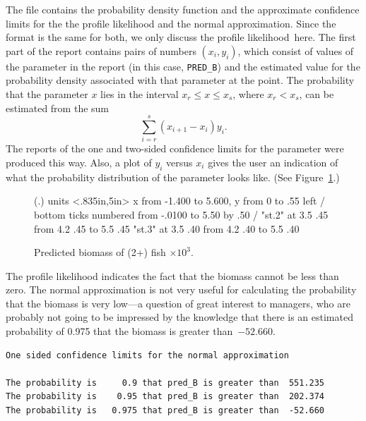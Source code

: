 \documentclass{admbmanual}
\newcommand\apl{profile likelihood}
\begin{document}
The file contains the probability density function and the approximate
confidence limits for the the profile likelihood and the normal approximation.
Since the format is the same for both, we only discuss the \apl\ here. The first
part of the report contains pairs of numbers $(x_i,y_i)$, which consist of
values of the parameter in the report (in this case, \texttt{PRED\_B}) and the
estimated value for the probability density associated with that parameter at
the point. The probability that the parameter $x$ lies in the interval
$x_r \le x\le x_s$,
where $x_r<x_s$, can be estimated from the sum
$$\sum_{i=r}^s (x_{i+1}-x_i)y_i.$$
The reports of the one and two-sided confidence limits for the parameter were
produced this way. Also, a plot of $y_i$ versus $x_i$ gives the user an
indication of what the probability distribution of the parameter looks like.
(See Figure~\ref{fig:05}.)
\begin{figure}[htbp]
\centering\hskip1pt\beginpicture
    \setplotsymbol ({\eightrm .})
  \setcoordinatesystem units <.835in,5in>
  \setplotarea x from -1.400 to 5.600, y from 0 to .55
  \axis left
  /
  \axis bottom
   ticks
    numbered from -.0100 to 5.50 by .50
  /
\setdashpattern <2pt,2pt,2pt,3pt>
 \plot  "st.2"
 \twelverm
  at 3.5 .45
 \putrule from 4.2 .45 to 5.5 .45
\setdashpattern <1pt,3pt,4pt,3pt>
 \plot  "st.3"
  at 3.5 .40
 \putrule from 4.2 .40 to 5.5 .40
\endpicture
\caption{Predicted biomass of (2+) fish $\times 10^3$.}
\label{fig:05}
\end{figure}

The profile likelihood indicates the fact that the biomass cannot be less than
zero. The normal approximation is not very useful for calculating the
probability that the biomass is very low---a question of great interest to
managers, who are probably not going to be impressed by the knowledge that there
is an estimated probability of 0.975 that the biomass is greater than~$-52.660$.
\begin{lstlisting}
One sided confidence limits for the normal approximation

The probability is     0.9 that pred_B is greater than  551.235
The probability is    0.95 that pred_B is greater than  202.374
The probability is   0.975 that pred_B is greater than  -52.660
\end{lstlisting}
\end{document}

